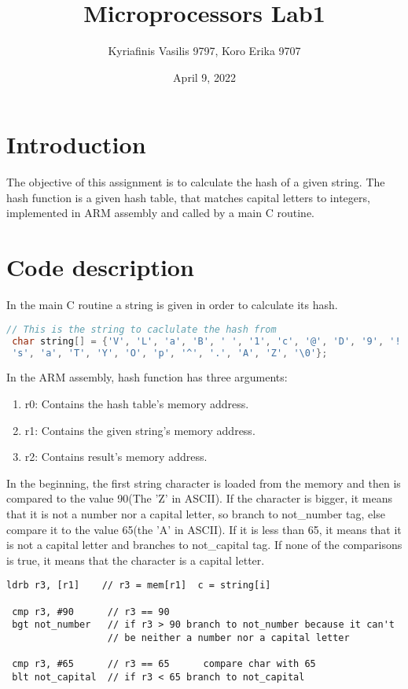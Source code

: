 \documentclass[a4paper, 12pt]{report}
\title{\Large{\textbf{Microprocessors Lab1}}}
\author{Kyriafinis Vasilis 9797, Koro Erika 9707}
\date{April 9, 2022}
\begin{document}
    \maketitle
    
    \section*{Introduction}
    The objective of this assignment is to calculate the hash of a given string.
    The hash function is a given hash table, that matches capital letters to integers, implemented in ARM
    assembly and called by a main C routine. 

    \section*{Code description}
    In the main C routine a string is given in order to calculate its hash.
    
    \bigskip
    \begin{lstlisting}[language = C]
 // This is the string to caclulate the hash from
 char string[] = {'V', 'L', 'a', 'B', ' ', '1', 'c', '@', 'D', '9', '!',
 's', 'a', 'T', 'Y', 'O', 'p', '^', '.', 'A', 'Z', '\0'};
    \end{lstlisting}

    \bigskip
    \bigskip
    In the ARM assembly, hash function has three arguments: 

    \begin{enumerate}
        \item r0: Contains the hash table's memory address.
        \item r1: Contains the given string's memory address.
        \item r2: Contains result's memory address.
    \end{enumerate}

    In the beginning, the first string character is loaded from the memory and then is compared to the value
    90(The 'Z' in ASCII). If the character is bigger, it means that it is not a number nor a capital
    letter, so branch to not\_number tag, else compare it to the value 65(the 'A' in ASCII). If it is less than
    65, it means that it is not a capital letter and branches to not\_capital tag. If none of the comparisons is
    true, it means that the character is a capital letter.

    \begin{lstlisting}[language=assembly]
 ldrb r3, [r1]    // r3 = mem[r1]  c = string[i]	
		
 cmp r3, #90      // r3 == 90
 bgt not_number   // if r3 > 90 branch to not_number because it can't 
                  // be neither a number nor a capital letter
		
 cmp r3, #65      // r3 == 65      compare char with 65
 blt not_capital  // if r3 < 65 branch to not_capital 
    \end{lstlisting}
    \bigskip
\end{document}
